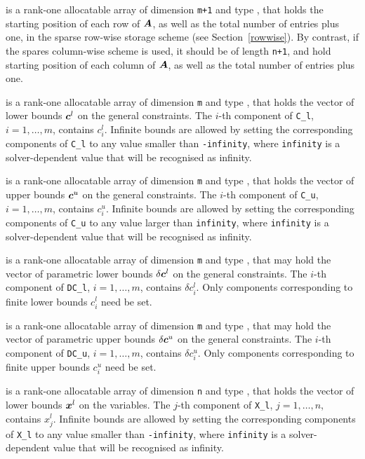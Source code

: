 \documentclass{galahad}
\begin{document}
\begin{description}
\begin{description}
 is a rank-one allocatable array of dimension {\tt m+1} and type 
\integer, that holds the 
starting position of each row of ${\bm{A}}$, as well
as the total number of entries plus one, in the sparse row-wise storage
scheme (see Section~\ref{rowwise}). By contrast, if the spares column-wise 
scheme is used, it should be of length {\tt n+1}, and hold
starting position of each column of ${\bm{A}}$, as well
as the total number of entries plus one.
\end{description}

 is a rank-one allocatable array of dimension {\tt m} and type 
\realdp, that holds the vector of lower bounds ${\bm{c}}^{l}$ 
on the general constraints. The $i$-th component of 
{\tt C\_l}, $i = 1, \ldots , m$, contains $c_{i}^{l}$.
Infinite bounds are allowed by setting the corresponding 
components of {\tt C\_l} to any value smaller than {\tt -infinity}, 
where {\tt infinity} is a  solver-dependent value that will be recognised as
infinity.

 is a rank-one allocatable array of dimension {\tt m} and type 
\realdp, that holds the vector of upper bounds ${\bm{c}}^{u}$ 
on the general constraints. The $i$-th component of 
{\tt C\_u}, $i = 1,  \ldots ,  m$, contains $c_{i}^{u}$.
Infinite bounds are allowed by setting the corresponding 
components of {\tt C\_u} to any value larger than {\tt infinity}, 
where {\tt infinity} is a  solver-dependent value that will be recognised as
infinity.

 is a rank-one allocatable array of dimension {\tt m} and type 
\realdp, that may hold the vector of parametric lower bounds 
$\delta {\bm{c}}^{l}$ on the general constraints. The $i$-th component of 
{\tt DC\_l}, $i = 1, \ldots , m$, contains $\delta c_{i}^{l}$.
Only components corresponding to finite lower bounds $c_{i}^{l}$
need be set.

 is a rank-one allocatable array of dimension {\tt m} and type 
\realdp, that may hold the vector of parametric upper bounds 
$\delta {\bm{c}}^{u}$  on the general constraints. The $i$-th component of 
{\tt DC\_u}, $i = 1,  \ldots ,  m$, contains $\delta c_{i}^{u}$.
Only components corresponding to finite upper bounds $c_{i}^{u}$
need be set.

 is a rank-one allocatable array of dimension {\tt n} and type 
\realdp, that holds
the vector of lower bounds ${\bm{x}}^{l}$ on the variables.
The $j$-th component of {\tt X\_l}, $j = 1, \ldots , n$, 
contains $x_{j}^{l}$.
Infinite bounds are allowed by setting the corresponding 
components of {\tt X\_l} to any value smaller than {\tt -infinity}, 
where {\tt infinity} is a  solver-dependent value that will be recognised as
infinity.


\end{description}
\end{document}
